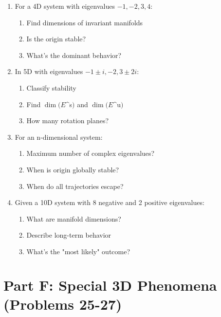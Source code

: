 \documentclass[12pt]{article}
\begin{document}
\begin{enumerate}[resume]
\item For a 4D system with eigenvalues $-1, -2, 3, 4$:
\begin{enumerate}[label=(\alph*)]
    \item Find dimensions of invariant manifolds
    \item Is the origin stable?
    \item What's the dominant behavior?
\end{enumerate}

\item In 5D with eigenvalues $-1 \pm i, -2, 3 \pm 2i$:
\begin{enumerate}[label=(\alph*)]
    \item Classify stability
    \item Find $\dim(E$^{s}$)$ and $\dim(E$^{u}$)$
    \item How many rotation planes?
\end{enumerate}

\item For an n-dimensional system:
\begin{enumerate}[label=(\alph*)]
    \item Maximum number of complex eigenvalues?
    \item When is origin globally stable?
    \item When do all trajectories escape?
\end{enumerate}

\item Given a 10D system with 8 negative and 2 positive eigenvalues:
\begin{enumerate}[label=(\alph*)]
    \item What are manifold dimensions?
    \item Describe long-term behavior
    \item What's the "most likely" outcome?
\end{enumerate}
\end{enumerate}

\section*{Part F: Special 3D Phenomena (Problems 25-27)}
\end{document}
